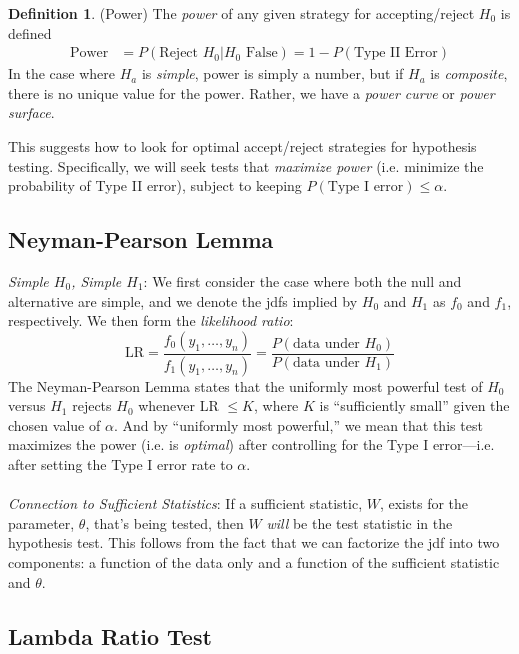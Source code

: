 \documentclass[12pt]{article}
\theoremstyle{plain}
\theoremstyle{definition}
\newtheorem{defn}[thm]{Definition}
\theoremstyle{remark}
\begin{document}
\begin{defn}(Power)
The \emph{power} of any given strategy for accepting/reject $H_0$ is
defined
\begin{align*}
   \text{Power} &= P(\text{Reject $H_0$} | H_0 \text{ False})
   =1 - P(\text{Type II Error})
\end{align*}
In the case where $H_a$ is \emph{simple}, power is simply a number, but
if $H_a$ is \emph{composite}, there is no unique value for the power.
Rather, we have a \emph{power curve} or \emph{power surface}.
\end{defn}

This suggests how to look for optimal accept/reject strategies for
hypothesis testing.
Specifically, we will seek tests that \emph{maximize power} (i.e.
minimize the probability of Type II error), subject to keeping
$P(\text{Type I error})\leq\alpha$.


\clearpage
\subsection{Neyman-Pearson Lemma}

{\sl Simple $H_0$, Simple $H_1$}: We first consider the case where
both the null and alternative are simple, and we denote the jdfs
implied by $H_0$ and $H_1$ as $f_0$ and $f_1$, respectively. We
then form the \emph{likelihood ratio}:
\[ \text{LR} = \frac{f_0(y_1, \ldots, y_n)}{f_1(y_1, \ldots, y_n)}=
   \frac{P(\text{data under $H_0$})}{P(\text{data under $H_1$})}
   \]
The Neyman-Pearson Lemma states that the uniformly most powerful
test of $H_0$ versus $H_1$ rejects $H_0$ whenever LR $\leq K$,
where $K$ is ``sufficiently small'' given the chosen value of $\alpha$.
And by ``uniformly most powerful,'' we mean that this test
maximizes the power (i.e. is \emph{optimal})
after controlling for the Type I error---i.e.
after setting the Type I error rate to $\alpha$.
\\
\\
{\sl Connection to Sufficient Statistics}: If a sufficient statistic,
$W$, exists for the parameter, $\theta$, that's being tested, then
$W$ \emph{will} be the test statistic in the hypothesis test. This
follows from the fact that we can factorize the jdf into two
components: a function of the data only and a function of the sufficient
statistic and $\theta$.

\subsection{Lambda Ratio Test}
\end{document}

